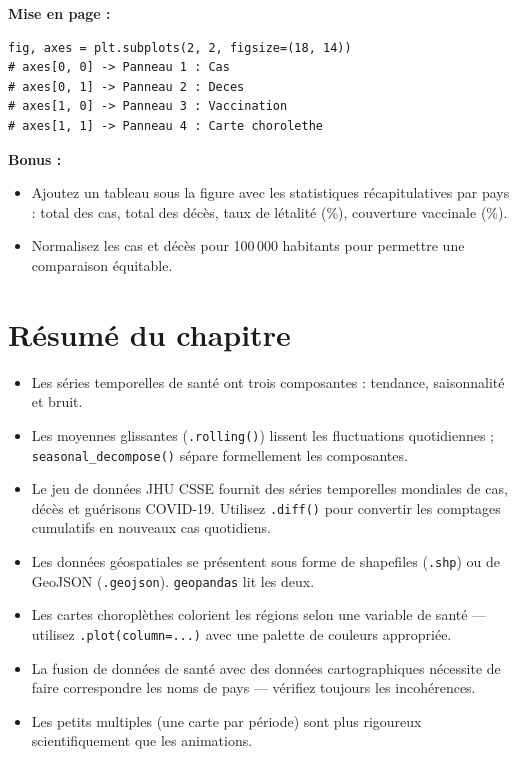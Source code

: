 \begin{exercise}
\textbf{Mise en page :}
\begin{verbatim}
fig, axes = plt.subplots(2, 2, figsize=(18, 14))
# axes[0, 0] -> Panneau 1 : Cas
# axes[0, 1] -> Panneau 2 : Deces
# axes[1, 0] -> Panneau 3 : Vaccination
# axes[1, 1] -> Panneau 4 : Carte chorolethe
\end{verbatim}

\textbf{Bonus :}
\begin{itemize}
  \item Ajoutez un tableau sous la figure avec les statistiques r\'ecapitulatives par pays : total des cas, total des d\'ec\`es, taux de l\'etalit\'e (\%), couverture vaccinale (\%).
  \item Normalisez les cas et d\'ec\`es pour 100\,000 habitants pour permettre une comparaison \'equitable.
\end{itemize}
\end{exercise}

\section{R\'esum\'e du chapitre}

\begin{itemize}
  \item Les s\'eries temporelles de sant\'e ont trois composantes : tendance, saisonnalit\'e et bruit.
  \item Les moyennes glissantes (\texttt{.rolling()}) lissent les fluctuations quotidiennes ; \texttt{seasonal\_decompose()} s\'epare formellement les composantes.
  \item Le jeu de donn\'ees JHU CSSE fournit des s\'eries temporelles mondiales de cas, d\'ec\`es et gu\'erisons COVID-19. Utilisez \texttt{.diff()} pour convertir les comptages cumulatifs en nouveaux cas quotidiens.
  \item Les donn\'ees g\'eospatiales se pr\'esentent sous forme de shapefiles (\texttt{.shp}) ou de GeoJSON (\texttt{.geojson}). \texttt{geopandas} lit les deux.
  \item Les cartes choropl\`ethes colorient les r\'egions selon une variable de sant\'e --- utilisez \texttt{.plot(column=...)} avec une palette de couleurs appropri\'ee.
  \item La fusion de donn\'ees de sant\'e avec des donn\'ees cartographiques n\'ecessite de faire correspondre les noms de pays --- v\'erifiez toujours les incoh\'erences.
  \item Les petits multiples (une carte par p\'eriode) sont plus rigoureux scientifiquement que les animations.
\end{itemize}
